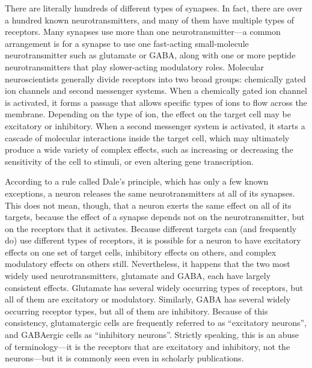 \documentclass[]{book}
\begin{document}
There are literally hundreds of different types of synapses. In fact, there are over a hundred known neurotransmitters, and many of them have multiple types of receptors. Many synapses use more than one neurotransmitter---a common arrangement is for a synapse to use one fast-acting small-molecule neurotransmitter such as glutamate or GABA, along with one or more peptide neurotransmitters that play slower-acting modulatory roles. Molecular neuroscientists generally divide receptors into two broad groups: chemically gated ion channels and second messenger systems. When a chemically gated ion channel is activated, it forms a passage that allows specific types of ions to flow across the membrane. Depending on the type of ion, the effect on the target cell may be excitatory or inhibitory. When a second messenger system is activated, it starts a cascade of molecular interactions inside the target cell, which may ultimately produce a wide variety of complex effects, such as increasing or decreasing the sensitivity of the cell to stimuli, or even altering gene transcription.

According to a rule called Dale's principle, which has only a few known exceptions, a neuron releases the same neurotransmitters at all of its synapses. This does not mean, though, that a neuron exerts the same effect on all of its targets, because the effect of a synapse depends not on the neurotransmitter, but on the receptors that it activates. Because different targets can (and frequently do) use different types of receptors, it is possible for a neuron to have excitatory effects on one set of target cells, inhibitory effects on others, and complex modulatory effects on others still. Nevertheless, it happens that the two most widely used neurotransmitters, glutamate and GABA, each have largely consistent effects. Glutamate has several widely occurring types of receptors, but all of them are excitatory or modulatory. Similarly, GABA has several widely occurring receptor types, but all of them are inhibitory. Because of this consistency, glutamatergic cells are frequently referred to as ``excitatory neurons'', and GABAergic cells as ``inhibitory neurons''. Strictly speaking, this is an abuse of terminology---it is the receptors that are excitatory and inhibitory, not the neurons---but it is commonly seen even in scholarly publications.
\end{document}
